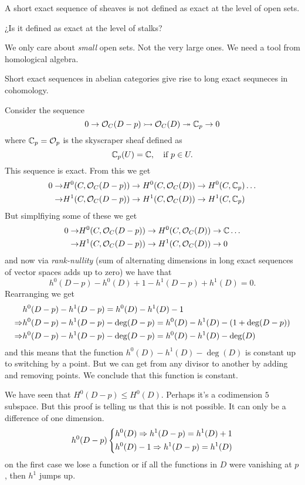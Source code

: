 \documentclass[12pt]{memoir}
\begin{document}
A short exact sequence of sheaves is not defined as exact at the level of open sets. 

\begin{significant}
    ¿Is it defined as exact at the level of stalks?
\end{significant}

We only care about \emph{small} open sets. Not the very large ones. We need a tool from homological algebra.

\begin{Lem}
    Short exact sequences in abelian categories give rise to long exact sequneces in cohomology.
\end{Lem}

\begin{ptcbp}
    Consider the sequence 
    $$0\to\mathcal{O}_C(D-p)\rightarrowtail\mathcal{O}_C(D)\twoheadrightarrow\mathbb{C}_p\to 0$$
    where $\mathbb{C}_p=\mathcal{O}_p$ is the skyscraper sheaf defined as 
    $$\mathbb{C}_p(U)=\mathbb{C},\quad\text{if }p\in U.$$
    This sequence is exact. From this we get 
    \begin{align*}
        0\to&H^0(C,\mathcal{O}_C(D-p))\to H^0(C,\mathcal{O}_C(D))\to H^0(C,\mathbb{C}_p)\dots\\
        \to&H^1(C,\mathcal{O}_C(D-p))\to H^1(C,\mathcal{O}_C(D))\to H^1(C,\mathbb{C}_p)
    \end{align*}
    But simplfiying some of these we get
    \begin{align*}
        0\to&H^0(C,\mathcal{O}_C(D-p))\to H^0(C,\mathcal{O}_C(D))\to\mathbb{C}\dots\\
        \to&H^1(C,\mathcal{O}_C(D-p))\to H^1(C,\mathcal{O}_C(D))\to 0
    \end{align*}
    and now via \emph{rank-nullity} (sum of alternating dimensions in long exact sequences of vector spaces adds up to zero) we have that 
    $$h^0(D-p)-h^0(D)+1-h^1(D-p)+h^1(D)=0.$$
    Rearranging we get 
    \begin{align*}
        &h^0(D-p)-h^1(D-p)=h^0(D)-h^1(D)-1\\
        \Rightarrow&h^0(D-p)-h^1(D-p)-\deg(D-p)=h^0(D)-h^1(D)-(1+\deg(D-p))\\
        \Rightarrow&h^0(D-p)-h^1(D-p)-\deg(D-p)=h^0(D)-h^1(D)-\deg(D)
    \end{align*}
    and this means that the function $h^0(D)-h^1(D)-\deg(D)$ is constant up to switching by a point. But we can get from any divisor to another by adding and removing points. We conclude that this function is constant.
\end{ptcbp}

\begin{Rmk}
    We have seen that $H^0(D-p)\leq H^0(D)$. Perhaps it's a codimension $5$ subspace. But this proof is telling us that this is not possible. It can only be a difference of one dimension. 
    $$
    h^0(D-p)
    \left\lbrace
    \begin{aligned}
        &h^0(D)\Rightarrow h^1(D-p)=h^1(D)+1\\
        &h^0(D)-1\Rightarrow h^1(D-p)=h^1(D)
    \end{aligned}
    \right.
    $$
    on the first case we lose a function or if all the functions in $D$ were vanishing at $p$, then $h^1$ jumps up.
\end{Rmk}
\end{document}
